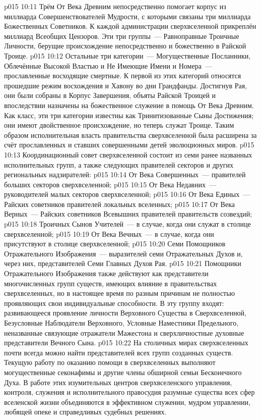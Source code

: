 \vs p015 10:11 \pc Трём От Века Древним непосредственно помогает корпус из миллиарда Совершенствователей Мудрости, с которыми связаны три миллиарда Божественных Советников. К каждой администрации сверхвселенной прикреплён миллиард Всеобщих Цензоров. Эти три группы~--- Равноправные Троичные Личности, берущие происхождение непосредственно и божественно в Райской Троице.
\vs p015 10:12 Остальные три категории~--- Могущественные Посланники, Облечённые Высокой Властью и Не Имеющие Имени и Номера~--- прославленные восходящие смертные. К первой из этих категорий относятся прошедшие режим восхождения и Хавону во дни Грандфанды. Достигнув Рая, они были собраны в Корпус Завершения, объяты Райской Троицей и впоследствии назначены на божественное служение в помощь От Века Древним. Как класс, эти три категории известны как Тринитизованные Сыны Достижения; они имеют двойственное происхождение, но теперь служат Троице. Таким образом исполнительная власть правительства сверхвселенной была расширена за счёт прославленных и ставших совершенными детей эволюционных миров.
\vs p015 10:13 Координационный совет сверхвселенной состоит из семи ранее названных исполнительных групп, а также следующих правителей секторов и других региональных надзирателей:
\vs p015 10:14 От Века Совершенных~--- правителей больших секторов сверхвселенной;
\vs p015 10:15 От Века Недавних~--- руководителей малых секторов сверхвселенной;
\vs p015 10:16 От Века Единых~--- Райских советников правителей локальных вселенных;
\vs p015 10:17 От Века Верных~--- Райских советников Всевышних правителей правительств созвездий;
\vs p015 10:18 Троичных Сынов Учителей~--- в случае, когда они служат в столице сверхвселенной;
\vs p015 10:19 От Века Вечных~--- в случае, когда они присутствуют в столице сверхвселенной;
\vs p015 10:20 Семи Помощников Отражательного Изображения~--- выразителей семи Отражательных Духов и, через них, представителей Семи Главных Духов Рая.
\vs p015 10:21 \pc Помощники Отражательного Изображения также действуют как представители многочисленных групп существ, имеющих влияние в правительствах сверхвселенных, но в настоящее время по разным причинам не полностью проявляющих свои индивидуальные способности. В эту группу входят: развивающееся проявление личности Верховного Существа в Сверхвселенной, Безусловные Наблюдатели Верховного, Условные Наместники Предельного, неназванные связующие отражатели Мажестона и сверхличностные духовные представители Вечного Сына.
\vs p015 10:22 \pc На столичных мирах сверхвселенных почти всегда можно найти представителей всех групп созданных существ. Текущую работу по оказанию помощи в сверхвселенных выполняют могущественные секонафимы и другие члены обширной семьи Бесконечного Духа. В работе этих изумительных центров сверхвселенского управления, контроля, служения и исполнительного правосудия разумные существа всех сфер вселенской жизни объединяются в эффективном служении, мудром управлении, любящей опеке и справедливых судебных решениях.
